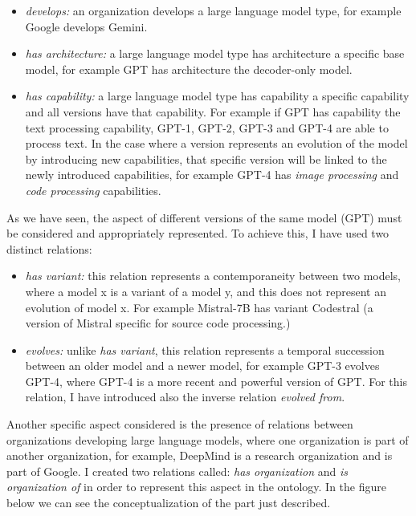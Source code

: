 \begin{itemize}
    \item \textit{develops:} an organization develops a large language model type, for example Google develops Gemini.

    \item \textit{has architecture:} a large language model type has architecture a specific base model, for example GPT has architecture the decoder-only model.

    \item \textit{has capability:} a large language model type has capability a specific capability and all versions have that capability. For example if GPT has capability the text processing capability, GPT-1, GPT-2, GPT-3 and GPT-4 are able to process text. In the case where a version represents an evolution of the model by introducing new capabilities, that specific version will be linked to the newly introduced capabilities, for example GPT-4 has \textit{image processing} and \textit{code processing} capabilities.
\end{itemize}
As we have seen, the aspect of different versions of the same model (GPT) must be considered and appropriately represented. To achieve this, I have used two distinct relations:
\begin{itemize}
    \item \textit{has variant:} this relation represents a contemporaneity between two models, where a model x is a variant of a model y, and this does not represent an evolution of model x. For example Mistral-7B has variant Codestral (a version of Mistral specific for source code processing.)

    \item \textit{evolves:} unlike \textit{has variant}, this relation represents a temporal succession between an older model and a newer model, for example GPT-3 evolves GPT-4, where GPT-4 is a more recent and powerful version of GPT. For this relation, I have introduced also the inverse relation \textit{evolved from}.
\end{itemize}
Another specific aspect considered is the presence of relations between organizations developing large language models, where one organization is part of another organization, for example, DeepMind is a research organization and is part of Google. I created two relations called: \textit{has organization} and \textit{is organization of} in order to represent this aspect in the ontology. In the figure below we can see the conceptualization of the part just described.
